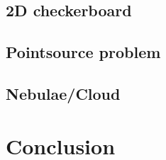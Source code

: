 \subsection{2D checkerboard}
\subsection{Pointsource problem}
\subsection{Nebulae/Cloud}

\section{Conclusion}
\label{sec:conclusion}






%







